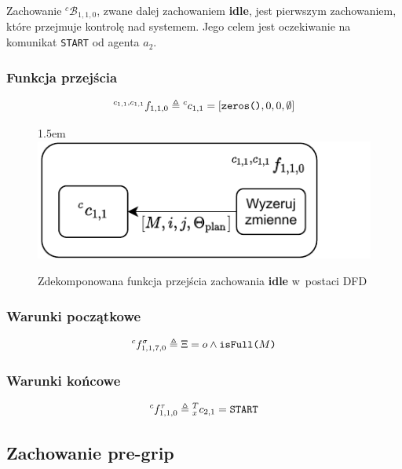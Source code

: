 Zachowanie ${}^{c}\mathcal{B}_{1,1,0}$, zwane dalej zachowaniem \textbf{idle}, jest pierwszym zachowaniem, które przejmuje kontrolę nad systemem. Jego celem jest oczekiwanie na komunikat \texttt{START} od agenta $a_{2}$.

\subsubsection{Funkcja przejścia}
\begin{equation}
{}^{c_{1,1}, c_{1,1}}f_{1,1,0} \triangleq {}^{c}c_{1,1} = [\text{\texttt{zeros()}}, 0, 0, \emptyset]  
\end{equation}

\begin{figure}[ht]
    \leftskip1.5em
    \includegraphics[width=\columnwidth]{figures/ISR-cs-fp-idle.pdf}
    \caption{Zdekomponowana funkcja przejścia zachowania \textbf{idle} w~postaci DFD}
    \label{fig:cs-fp-idle}
\end{figure}

\subsubsection{Warunki początkowe}
\begin{equation}
    {}^{c}f^{\sigma}_{1,1,7,0} \triangleq \Xi = o \land \text{\texttt{isFull($M$)}}
\end{equation}

\subsubsection{Warunki końcowe}
\begin{equation}
    {}^{c}f^{\tau}_{1,1,0} \triangleq {}^{T}_{x}c_{2,1} = \text{\texttt{START}}
\end{equation}


\subsection{Zachowanie pre-grip}
\label{subsec:cs-pre-grip}


